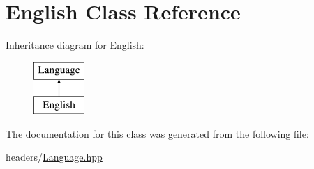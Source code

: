 \hypertarget{classEnglish}{}\section{English Class Reference}
\label{classEnglish}
Inheritance diagram for English\+:\begin{figure}[H]
\begin{center}
\leavevmode
\includegraphics[height=2.000000cm]{classEnglish}
\end{center}
\end{figure}


The documentation for this class was generated from the following file\+:\begin{DoxyCompactItemize}
\item 
headers/\hyperlink{Language_8hpp}{Language.\+hpp}\end{DoxyCompactItemize}
